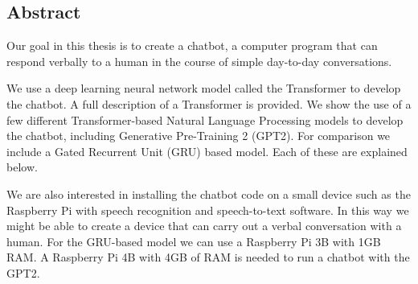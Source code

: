 
\begin{center}
	
\section*{Abstract}
\end{center}

	
Our goal in this thesis is to create a chatbot, a computer program that can respond verbally to a human in the course of simple day-to-day conversations.

We use a deep learning neural network model called the Transformer to develop the chatbot. A full description of a Transformer is provided. We show  the use of a few different Transformer-based Natural Language Processing models to develop the chatbot, including  Generative Pre-Training 2 (GPT2). For comparison we include a Gated Recurrent Unit (GRU) based model. Each of these are explained below.

We are also interested in installing the chatbot code on a small device  such as the Raspberry Pi with speech recognition and speech-to-text software. In this way we might be able to create a device that can carry out a verbal conversation with a human. For the GRU-based model we can use a Raspberry Pi 3B with 1GB RAM. A Raspberry Pi 4B with 4GB of RAM is needed to run a chatbot with the GPT2. 

